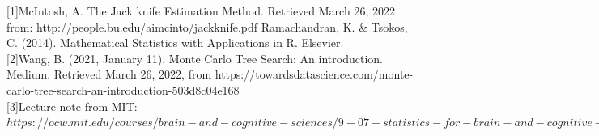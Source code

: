 \documentclass[11pt]{article}
\begin{document}
{


[1]McIntosh, A. The Jack knife Estimation Method. Retrieved March 26, 2022 from: http://people.bu.edu/aimcinto/jackknife.pdf
Ramachandran, K. \& Tsokos, C. (2014). Mathematical Statistics with Applications in R. Elsevier.\\

[2]Wang, B. (2021, January 11). Monte Carlo Tree Search: An introduction. Medium. Retrieved March 26, 2022, from https://towardsdatascience.com/monte-carlo-tree-search-an-introduction-503d8c04e168 \\

[3]Lecture note from MIT: $https://ocw.mit.edu/courses/brain-and-cognitive-sciences/9-07-statistics-for-brain-and-cognitive-science-fall-2016/lecture-notes/MIT9_07F16_lec11.pdf$
}


\end{document}

